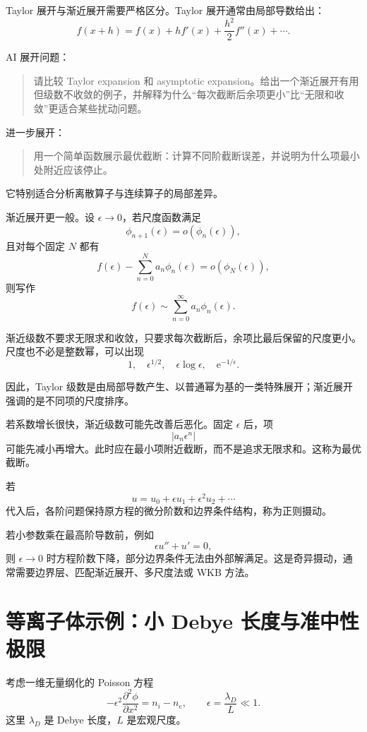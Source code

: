 \documentclass[11pt,openany]{ctexbook}
\newcommand{\ee}{\mathrm e}
\begin{document}
Taylor 展开与渐近展开需要严格区分。Taylor 展开通常由局部导数给出：
\[
f(x+h)
=
f(x)+hf'(x)+\frac{h^2}{2}f''(x)+\cdots.
\]

\begin{askai}
AI 展开问题：
\begin{quote}
请比较 Taylor expansion 和 asymptotic expansion。给出一个渐近展开有用但级数不收敛的例子，并解释为什么“每次截断后余项更小”比“无限和收敛”更适合某些扰动问题。
\end{quote}

进一步展开：
\begin{quote}
用一个简单函数展示最优截断：计算不同阶截断误差，并说明为什么项最小处附近应该停止。
\end{quote}
\end{askai}

它特别适合分析离散算子与连续算子的局部差异。

渐近展开更一般。设 \(\epsilon\to0\)，若尺度函数满足
\[
\phi_{n+1}(\epsilon)=o(\phi_n(\epsilon)),
\]
且对每个固定 \(N\) 都有
\[
f(\epsilon)
-
\sum_{n=0}^{N}a_n\phi_n(\epsilon)
=
o(\phi_N(\epsilon)),
\]
则写作
\[
f(\epsilon)\sim\sum_{n=0}^{\infty}a_n\phi_n(\epsilon).
\]

渐近级数不要求无限求和收敛，只要求每次截断后，余项比最后保留的尺度更小。尺度也不必是整数幂，可以出现
\[
1,\quad
\epsilon^{1/2},\quad
\epsilon\log\epsilon,\quad
\ee^{-1/\epsilon}.
\]

因此，Taylor 级数是由局部导数产生、以普通幂为基的一类特殊展开；渐近展开强调的是不同项的尺度排序。

若系数增长很快，渐近级数可能先改善后恶化。固定 \(\epsilon\) 后，项
\[
|a_n\epsilon^n|
\]
可能先减小再增大。此时应在最小项附近截断，而不是追求无限求和。这称为最优截断。

若
\[
u=u_0+\epsilon u_1+\epsilon^2u_2+\cdots
\]
代入后，各阶问题保持原方程的微分阶数和边界条件结构，称为正则摄动。

若小参数乘在最高阶导数前，例如
\[
\epsilon u''+u'=0,
\]
则 \(\epsilon\to0\) 时方程阶数下降，部分边界条件无法由外部解满足。这是奇异摄动，通常需要边界层、匹配渐近展开、多尺度法或 WKB 方法。

\section{等离子体示例：小 Debye 长度与准中性极限}

考虑一维无量纲化的 Poisson 方程
\[
-\epsilon^2\frac{\partial^2\phi}{\partial x^2}
=
n_i-n_e,
\qquad
\epsilon=\frac{\lambda_D}{L}\ll1.
\]
这里 \(\lambda_D\) 是 Debye 长度，\(L\) 是宏观尺度。
\end{document}
